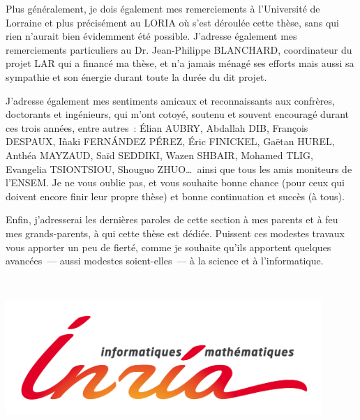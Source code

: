 \begin{ThesisAcknowledgments}
\smallskip

Plus généralement, je dois également mes remerciements à l'Université
de Lorraine et plus précisément au LORIA où s'est déroulée cette thèse,
sans qui rien n'aurait bien évidemment été possible. J'adresse également
mes remerciements particuliers au Dr. Jean-Philippe BLANCHARD,
coordinateur du projet LAR qui a financé ma thèse, et n'a jamais ménagé
ses efforts mais aussi sa sympathie et son énergie durant toute la durée
du dit projet.

\smallskip

J'adresse également mes sentiments amicaux et reconnaissants aux confrères,
doctorants et ingénieurs, qui m'ont cotoyé, soutenu et souvent encouragé
durant ces trois années, entre autres~: \'Elian AUBRY, Abdallah DIB,
François DESPAUX, I\~naki FERN\'ANDEZ P\'EREZ, \'Eric FINICKEL, Gaëtan
HUREL, Anthéa MAYZAUD, Saïd SEDDIKI, Wazen SHBAIR, Mohamed TLIG, Evangelia
TSIONTSIOU, Shouguo ZHUO\ldots\ ainsi que tous les amis moniteurs de l'ENSEM.
Je ne vous oublie pas, et vous souhaite bonne chance (pour ceux qui doivent
encore finir leur propre thèse) et bonne continuation et succès (à tous).

\medskip

Enfin, j'adresserai les dernières paroles de cette section à mes parents
et à feu mes grands-parents, à qui cette thèse est dédiée. Puissent ces
modestes travaux vous apporter un peu de fierté, comme je souhaite qu'ils
apportent quelques avancées~--- aussi modestes soient-elles~---
à la science et à l'informatique.

\end{ThesisAcknowledgments}


\newpage  %

\ \\

\begin{center}
\includegraphics[width=12cm]{logo-inria.png}
\end{center}

